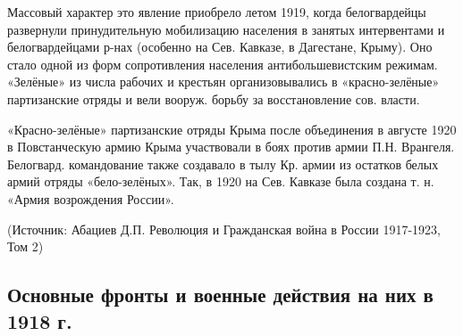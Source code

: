 Массовый характер это явление приобрело летом 1919, когда белогвардейцы развернули принудительную мобилизацию населения в занятых интервентами и белогвардейцами р-нах (особенно на Сев. Кавказе, в Дагестане, Крыму).
Оно стало одной из форм сопротивления населения антибольшевистским режимам.
«Зелёные» из числа рабочих и крестьян организовывались в «красно-зелёные» партизанские отряды и вели вооруж. борьбу за восстановление сов. власти.

«Красно-зелёные» партизанские отряды Крыма после объединения в августе 1920 в Повстанческую армию Крыма участвовали в боях против армии П.Н. Врангеля.
Белогвард. командование также создавало в тылу Кр. армии из остатков белых армий отряды «бело-зелёных». Так, в 1920 на Сев. Кавказе была создана т. н. «Армия возрождения России».

(Источник: Абациев Д.П. Революция и Гражданская война в России 1917-1923, Том 2)

\subsection{Основные фронты и военные действия на них в 1918 г.}

